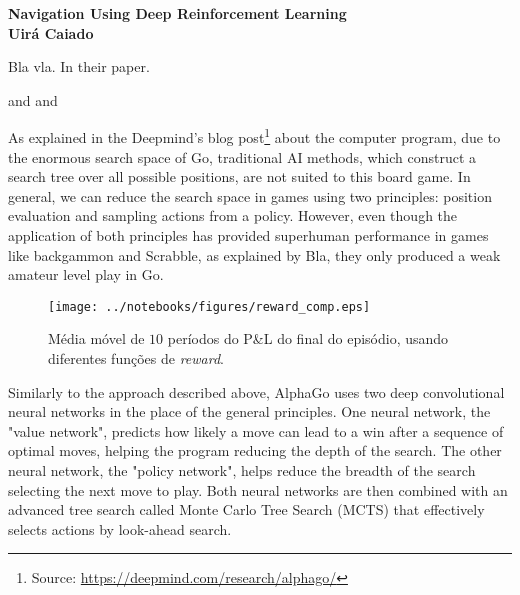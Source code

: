 \documentclass[a4paper]{article}
\begin{document}

\begin{center}

{\bf \large {Navigation Using Deep Reinforcement Learning \\ \small Uirá Caiado}}
\end{center}




Bla vla. In their paper.

\cite{SchaulQAS15} and \cite{mnih2015humanlevel} and \cite{HasseltGS15}

As explained in the Deepmind's blog post\footnote{Source: \url{https://deepmind.com/research/alphago/}} about the computer program, due to the enormous search space of Go, traditional AI methods, which construct a search tree over all possible positions, are not suited to this board game. In general, we can reduce the search space in games using two principles: position evaluation and sampling actions from a policy. However, even though the application of both principles has provided superhuman performance in games like backgammon and Scrabble, as explained by Bla, they only produced a weak amateur level play in Go.


\begin{figure}[ht]
\centering
\captionsetup{margin=2cm}
\texttt{[image: ../notebooks/figures/reward\_comp.eps]}
\caption{Média móvel de $10$ períodos do P\&L do final do episódio, usando diferentes funções de \textit{reward}.}
\label{fig:rwd_funcs}
\end{figure}


Similarly to the approach described above, AlphaGo uses two deep convolutional neural networks in the place of the general principles. One neural network, the "value network", predicts how likely a move can lead to a win after a sequence of optimal moves, helping the program reducing the depth of the search. The other neural network, the "policy network", helps reduce the breadth of the search selecting the next move to play. Both neural networks are then combined with an advanced tree search called Monte Carlo Tree Search (MCTS) that effectively selects actions by look-ahead search.
\end{document}
